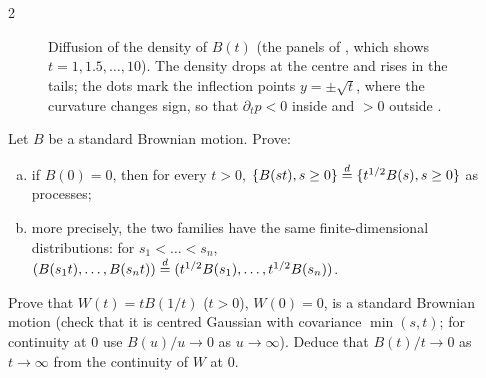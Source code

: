 \begin{paracol}{2}
\begin{figure}[ht]
\centering
{}
\caption{Diffusion of the density of $B(t)$ (the panels of , which shows $t=1,1.5,\dots,10$). The
density drops at the centre and rises in the tails; the dots mark the inflection points $y=\pm\sqrt t$, where the curvature
changes sign, so that $\partial_tp<0$ inside and $>0$ outside .}\label{ch11:fig-heat}
\end{figure}

\begin{exercise}\label{ch11:ex-scaling}
Let $B$ be a standard Brownian motion. Prove:
\begin{enumerate}[(a)]
  \item if $B(0)=0$, then for every $t>0$, $\{B(st),s\ge0\}\stackrel{d}{=}\{t^{1/2}B(s),s\ge0\}$ as processes;
  \item more precisely, the two families have the same finite-dimensional distributions: for $s_1<\dots<s_n$,
      $(B(s_1t),\dots,B(s_nt))\stackrel{d}{=}(t^{1/2}B(s_1),\dots,t^{1/2}B(s_n))$.
\end{enumerate}
\end{exercise}

\begin{exercise}\label{ch11:ex-inversion}
Prove that $W(t)=tB(1/t)$ ($t>0$), $W(0)=0$, is a standard Brownian motion (check that it is centred Gaussian with covariance $\min(s,t)$; for continuity at $0$ use
$B(u)/u\to0$ as $u\to\infty$). Deduce that $B(t)/t\to0$ as $t\to\infty$ from the continuity of $W$ at $0$.
\end{exercise}



\end{paracol}
